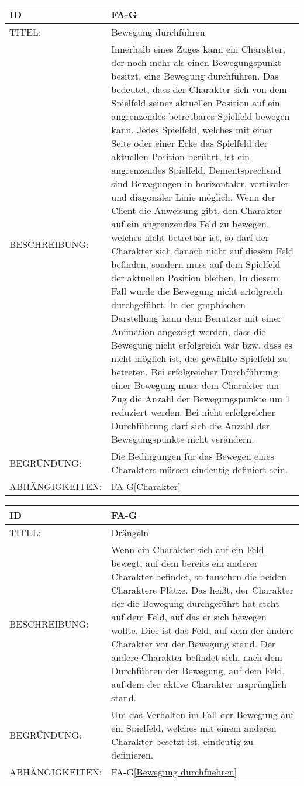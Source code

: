 \begin{tabularx}{16cm}{l|X}
	{table}\label{Bewegung durchfuehren}
	\textbf{ID} & \textbf{FA-G\arabic{table}} \\
	\hline
	TITEL: & Bewegung durchführen \\
	\hline
	BESCHREIBUNG: & Innerhalb eines Zuges kann ein Charakter, der noch mehr als einen Bewegungspunkt besitzt, eine Bewegung durchführen. Das bedeutet, dass der Charakter sich von dem Spielfeld seiner aktuellen Position auf ein angrenzendes betretbares Spielfeld bewegen kann.
	Jedes Spielfeld, welches mit einer Seite oder einer Ecke das Spielfeld der aktuellen Position berührt, ist ein angrenzendes Spielfeld. Dementsprechend sind Bewegungen in horizontaler, vertikaler und diagonaler Linie möglich.
	Wenn der Client die Anweisung gibt, den Charakter auf ein angrenzendes Feld zu bewegen, welches nicht betretbar ist, so darf der Charakter sich danach nicht auf diesem Feld befinden, sondern muss auf dem Spielfeld der aktuellen Position bleiben. In diesem Fall wurde die  Bewegung nicht erfolgreich durchgeführt. In der graphischen Darstellung kann dem Benutzer mit einer Animation angezeigt werden, dass die Bewegung nicht erfolgreich war bzw. dass es nicht möglich ist, das gewählte Spielfeld zu betreten.
 Bei erfolgreicher Durchführung einer Bewegung muss dem Charakter am Zug die Anzahl der Bewegungspunkte um 1 reduziert werden. Bei nicht erfolgreicher Durchführung darf sich die Anzahl der Bewegungspunkte  nicht verändern.\\
	\hline
	BEGRÜNDUNG: & Die Bedingungen für das Bewegen eines Charakters müssen eindeutig definiert sein.\\
	\hline
	ABHÄNGIGKEITEN: & FA-G\ref{Charakter} \todo[inline]{2.8.1 Wahlphase}\\
\end{tabularx}

\begin{tabularx}{16cm}{l|X}
	{table}\label{Draengeln}
	\textbf{ID} & \textbf{FA-G\arabic{table}} \\
	\hline
	TITEL: & Drängeln \\
	\hline
	BESCHREIBUNG: & Wenn ein Charakter sich auf ein Feld bewegt, auf dem bereits ein anderer Charakter 		befindet, so tauschen die beiden Charaktere Plätze. Das heißt, der Charakter der die Bewegung durchgeführt hat steht auf dem Feld, auf das er sich bewegen wollte. Dies ist das Feld, auf dem der andere Charakter vor der Bewegung stand. Der andere Charakter befindet sich, nach dem Durchführen der Bewegung, auf dem Feld, auf dem der aktive Charakter ursprünglich stand. \\
	\hline
	BEGRÜNDUNG: & Um das Verhalten im Fall der Bewegung auf ein Spielfeld, welches mit einem anderen 			Charakter besetzt ist, eindeutig zu definieren.\\
	\hline
	ABHÄNGIGKEITEN: & FA-G\ref{Bewegung durchfuehren} \todo[inline]{2.8.1 Wahlphase}\\
\end{tabularx}

